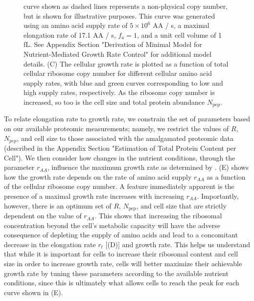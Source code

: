 \begin{figure}
{{        curve shown as dashed lines represents a non-physical copy number, but
        is shown for illustrative purposes. This curve was generated using an
        amino acid supply rate of $5 \times 10^6$ AA / s, a maximal elongation
        rate of 17.1 AA / s, $f_a = 1$, and a unit cell volume of 1 fL.
        See Appendix Section "Derivation of Minimal Model for Nutrient-Mediated
        Growth Rate Control" for additional model details. (C) The cellular
        growth rate is plotted as a function of total cellular ribosome copy
        number for different cellular amino acid supply rates, with blue and
        green curves corresponding to low and high supply rates, respectively.
        As the ribosome copy number is increased, so too is the cell size and
        total protein abundance $N_\text{pep}$.
    }
    \label{fig:elongation_rate_model}
    }
\end{figure}

To relate elongation rate to growth rate, we constrain the set of parameters
based on our available proteomic measurements; namely, we restrict the values of
$R$, $N_{pep}$, and cell size to those associated with the amalgamated proteomic
data (described in the Appendix Section "Estimation of Total Protein Content per
Cell"). We then consider how changes in the nutrient conditions, through the
parameter $r_{AA}$, influence the maximum growth rate as determined by
. (E) shows how the growth rate
depends on the rate of amino acid supply $r_{AA}$ as a function of the cellular
ribosome copy number. A feature immediately apparent is the presence of a
maximal growth rate increases with increasing $r_{AA}$. Importantly, however,
there is an optimum set of $R$, $N_\text{pep}$, and cell size that are strictly
dependent on the value of $r_{AA}$. This shows that increasing the ribosomal
concentration beyond the cell's metabolic capacity will have the adverse
consequence of depleting the supply of amino acids and lead to a concomitant
decrease in the elongation rate $r_t$ [(D)] and
growth rate. This helps us understand that while it is important for cells to
increase their ribosomal content and cell size in order to increase growth rate,
cells will better maximize their achievable growth rate by tuning these
parameters according to the available nutrient conditions, since this is
ultimately what allows cells to reach the peak for each curve shown in
(E).

